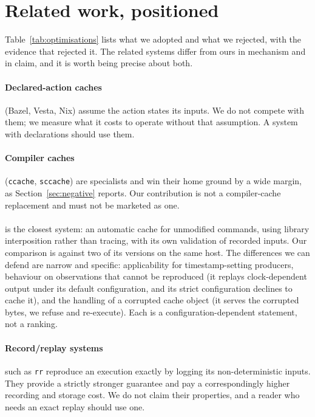 \section{Related work, positioned}

Table~\ref{tab:optimisations} lists what we adopted and what we rejected, with the evidence that
rejected it. The related systems differ from ours in mechanism and in claim, and it is worth being
precise about both.

\paragraph{Declared-action caches} (Bazel, Vesta, Nix) assume the action states its inputs. We do
not compete with them; we measure what it costs to operate without that assumption. A system with
declarations should use them.

\paragraph{Compiler caches} (\texttt{ccache}, \texttt{sccache}) are specialists and win their home
ground by a wide margin, as Section~\ref{sec:negative} reports. Our contribution is not a
compiler-cache replacement and must not be marketed as one.

\paragraph{\firebuild{}} is the closest system: an automatic cache for unmodified commands, using
library interposition rather than tracing, with its own validation of recorded inputs. Our
comparison is against two of its versions on the same host. The differences we can defend are
narrow and specific: applicability for timestamp-setting producers, behaviour on observations that
cannot be reproduced (it replays clock-dependent output under its default configuration, and its
strict configuration declines to cache it), and the handling of a corrupted cache object
(it serves the corrupted bytes, we refuse and re-execute). Each is a configuration-dependent
statement, not a ranking.

\paragraph{Record/replay systems} such as \texttt{rr} reproduce an execution exactly by logging its
non-deterministic inputs. They provide a strictly stronger guarantee and pay a correspondingly
higher recording and storage cost. We do not claim their properties, and a reader who needs an
exact replay should use one.

